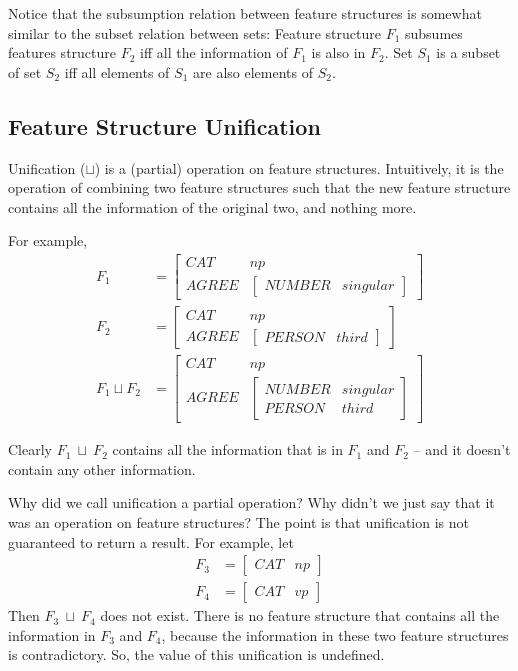 \documentclass{article}
\begin{document}
\begin{CJK}{UTF8}{gbsn}
Notice that the subsumption relation between feature structures is somewhat similar to the subset relation between sets: Feature structure $F_1$  subsumes features structure $F_2$  iff all the information of $F_1$  is also in $F_2$. Set $S_1$  is a subset of set $S_2$  iff all elements of $S_1$  are also elements of $S_2$.

\subsection{Feature Structure Unification}

Unification ($\sqcup$) is a (partial) operation on feature structures. Intuitively, it is the operation of combining two feature structures such that the new feature structure contains all the information of the original two, and nothing more.

For example, 
\begin{align*}
F_1 &=
\begin{bmatrix}
CAT & np \\
AGREE & 
\begin{bmatrix}
NUMBER & singular
\end{bmatrix}
\end{bmatrix} \\
F_2 &= 
\begin{bmatrix}
CAT & np \\
AGREE &
\begin{bmatrix}
PERSON & third
\end{bmatrix}
\end{bmatrix} \\
F_1 \sqcup F_2 &=
\begin{bmatrix}
CAT & np \\
AGREE & 
\begin{bmatrix}
NUMBER & singular \\
PERSON & third
\end{bmatrix}
\end{bmatrix}
\end{align*}

Clearly $F_1\ \sqcup \ F_2$  contains all the information that is in $F_1$  and $F_2$  -- and it doesn't contain any other information. 

Why did we call unification a partial operation? Why didn't we just say that it was an operation on feature structures? The point is that unification is not guaranteed to return a result. For example, let 
\begin{align*}
F_3 &=
\begin{bmatrix}
CAT & np
\end{bmatrix} \\
F_4 &=
\begin{bmatrix}
CAT & vp
\end{bmatrix}
\end{align*}
Then $F_3\ \sqcup \ F_4$  does not exist. There is no feature structure that contains all the information in $F_3$  and $F_4$, because the information in these two feature structures is contradictory. So, the value of this unification is undefined.


\end{CJK}
\end{document}
